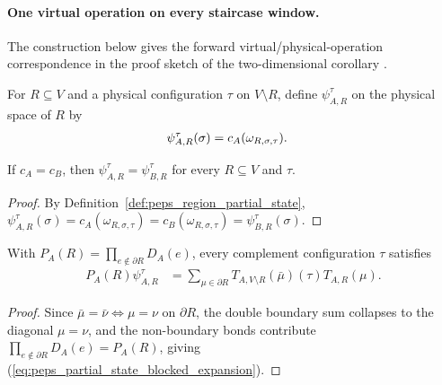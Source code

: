 \paragraph{One virtual operation on every staircase window.}

The construction below gives the forward virtual/physical-operation
correspondence in the proof sketch of the two-dimensional corollary
\cite[corollary after Lemma~5, lines~2297--2444]{Molnar2018NormalPEPS}.

\begin{definition}%
    \label{def:peps_region_partial_state}
    \leanok
    For $R\subseteq V$ and a physical configuration $\tau$ on $V\setminus R$,
    define $\psi^\tau_{A,R}$ on the physical space of $R$ by
    \begin{align}
        \psi^\tau_{A,R}(\sigma)
         & =c_A(\omega_{R,\sigma,\tau}).
        \notag
    \end{align}
\end{definition}

\begin{lemma}%
    \label{thm:peps_region_partial_state_same_state}
    \leanok
    If $c_A=c_B$, then $\psi^\tau_{A,R}=\psi^\tau_{B,R}$ for every $R\subseteq V$
    and $\tau$.
\end{lemma}
\begin{proof}
    \leanok
    By Definition~\ref{def:peps_region_partial_state},
    $\psi^\tau_{A,R}(\sigma)=c_A(\omega_{R,\sigma,\tau})=c_B(\omega_{R,\sigma,\tau})=\psi^\tau_{B,R}(\sigma)$.
\end{proof}

\begin{lemma}%
    \label{thm:peps_region_partial_state_blocked_expansion}
    \leanok
    With $P_A(R)=\prod_{e\notin\partial R}D_A(e)$, every complement
    configuration $\tau$ satisfies
    \begin{align}
        P_A(R)\psi^\tau_{A,R}
         & =\sum_{\mu\in\partial R}
        T_{A,V\setminus R}(\bar\mu)(\tau)T_{A,R}(\mu).
        \label{eq:peps_partial_state_blocked_expansion}
    \end{align}
\end{lemma}
\begin{proof}
    \leanok
    Since $\bar\mu=\bar\nu\iff\mu=\nu$ on $\partial R$, the double boundary sum
    collapses to the diagonal $\mu=\nu$, and the non-boundary bonds contribute
    $\prod_{e\notin\partial R}D_A(e)=P_A(R)$, giving
    (\ref{eq:peps_partial_state_blocked_expansion}).
\end{proof}

